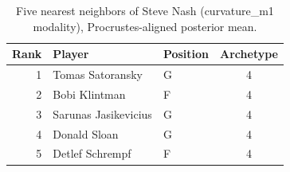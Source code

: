 \begin{table}[htbp]
  \centering\small
  \begin{tabular}{rllc}
    \toprule
    Rank & Player & Position & Archetype \\
    \midrule
    1 & Tomas Satoransky & G & 4 \\
    2 & Bobi Klintman & F & 4 \\
    3 & Sarunas Jasikevicius & G & 4 \\
    4 & Donald Sloan & G & 4 \\
    5 & Detlef Schrempf & F & 4 \\
    \bottomrule
  \end{tabular}
  \caption{Five nearest neighbors of Steve Nash (curvature_m1 modality), Procrustes-aligned posterior mean.}
  \label{tab:Steve_Nash_neighbors_curvature_m1}
\end{table}

